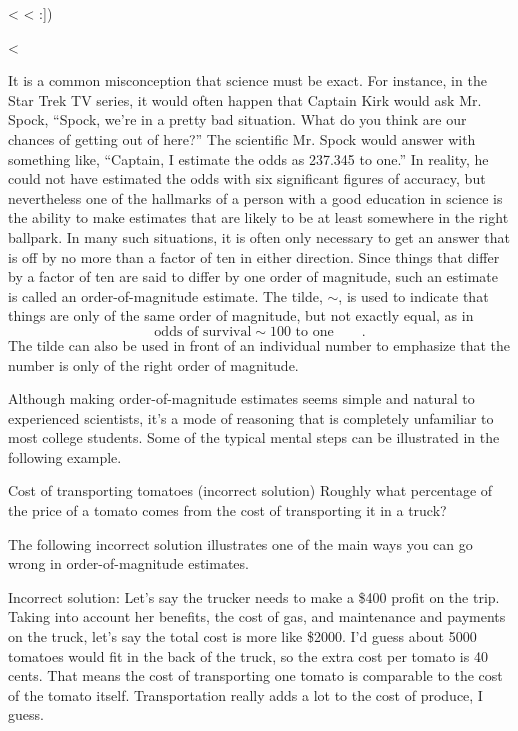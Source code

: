 <%
<%
:])%


<%


It is a common misconception that science must be exact. For
instance, in the Star Trek TV series, it would often happen
that Captain Kirk would ask Mr. Spock, ``Spock, we're in a
pretty bad situation. What do you think are our chances of
getting out of here?'' The scientific Mr. Spock would answer
with something like, ``Captain, I estimate the odds as
237.345 to one.'' In reality, he could not have estimated
the odds with six significant figures of accuracy, but
nevertheless one of the hallmarks of a person with a good
education in science is the ability to make estimates that
are likely to be at least somewhere in the right ballpark.
In many such situations, it is often only necessary to get
an answer that is off by no more than a factor of ten in
either direction. Since things that differ by a factor of
ten are said to differ by one order of magnitude, such an
estimate is called an order-of-magnitude estimate. The
tilde, $\sim$, is used to indicate that things are only of
the same order of magnitude, but not exactly equal, as in
\begin{equation*}
  \text{odds of survival} \sim \text{100 to one} \qquad .
\end{equation*}
The tilde can also be used in front of an individual number
to emphasize that the number is only of the right order of magnitude.

Although making order-of-magnitude estimates seems simple
and natural to experienced scientists, it's a mode of
reasoning that is completely unfamiliar to most college
students. Some of the typical mental steps can be illustrated
in the following example.

\begin{eg}{Cost of transporting tomatoes (incorrect solution)}
\egquestion Roughly what percentage of the price of a tomato
comes from the cost of transporting it in a truck?

\eganswer The following incorrect solution illustrates one of the main
ways you can go wrong in order-of-magnitude estimates.

Incorrect solution: Let's say the trucker needs to make a
\$400 profit on the trip. Taking into account her benefits,
the cost of gas, and maintenance and payments on the truck,
let's say the total cost is more like \$2000. I'd guess
about 5000 tomatoes would fit in the back of the truck, so
the extra cost per tomato is 40 cents. That means the cost
of transporting one tomato is comparable to the cost of the
tomato itself. Transportation really adds a lot to the cost
of produce, I guess.
\end{eg}


